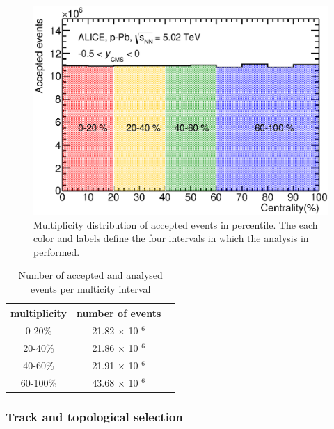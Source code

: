 \begin{figure}[htbp]
\begin{center}
\includegraphics[width=10.cm]{./Version1/FigChapter5/Selection/Centrality.eps}
\caption{ Multiplicity distribution of accepted events in percentile. The each color and labels define the four intervals in which the analysis in performed.}
\label{fig:Centrality}
\end{center}
\end{figure}



\begin{table}[htp]
\begin{center}
\begin{tabular}{|c|c|c|}
\hline
multiplicity & number of events\\
\hline
\hline
 0-20\% &21.82 $\times$ 10 $^{6}$\\
\hline
 20-40\% &21.86 $\times$ 10 $^{6}$\\
\hline
 40-60\% &21.91 $\times$ 10 $^{6}$\\
\hline
 60-100\% &43.68 $\times$ 10 $^{6}$\\
\hline
\end{tabular}
\caption{Number of accepted and analysed events per multicity interval}\label{table:NCentralityEvent}
\end{center}
\end{table}


\newpage
\subsubsection{Track and topological selection}\label{sec:Cut}

